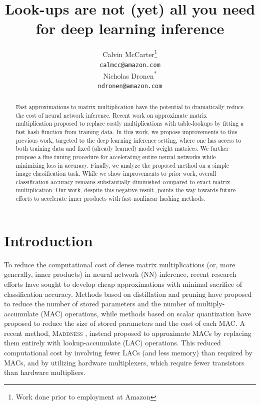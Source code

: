 \documentclass{article}
\title{Look-ups are not (yet) all you need \\ for deep learning inference}
\author{%

  Calvin McCarter\thanks{Work done prior to employment at Amazon} \\
  \texttt{calmcc@amazon.com} \\
  \And
  Nicholas Dronen\textsuperscript{*}\\
  \texttt{ndronen@amazon.com} \\  
}
\begin{document}
\maketitle

\begin{abstract}
  Fast approximations to matrix multiplication have the potential to dramatically reduce the cost of neural network inference. Recent work on approximate matrix multiplication proposed to replace costly multiplications with table-lookups by fitting a fast hash function from training data. In this work, we propose improvements to this previous work, targeted to the deep learning inference setting, where one has access to both training data and fixed (already learned) model weight matrices.
  We further propose a fine-tuning procedure for accelerating entire neural networks while minimizing loss in accuracy.
  Finally, we analyze the proposed method on a simple image classification task.
  While we show improvements to prior work, overall classification accuracy remains substantially diminished compared to exact matrix multiplication.
  Our work, despite this negative result, points the way towards future efforts to accelerate inner products with fast nonlinear hashing methods. 
\end{abstract}

\section{Introduction}
To reduce the computational cost of dense matrix multiplications (or, more generally, inner products) in neural network (NN) inference, recent research efforts have sought to develop cheap approximations with minimal sacrifice of classification accuracy.
Methods based on distillation \citep{bucilua2006model,hinton2015distilling} and pruning \citep{han2015deep,janowsky1989pruning} have proposed to reduce the number of stored parameters and the number of multiply-accumulate (MAC) operations, while methods based on scalar quantization \citep{wu2016quantized} have proposed to reduce the size of stored parameters and the cost of each MAC.  
A recent method, \textsc{Maddness} \citep{blalock2021a}, instead proposed to approximate MACs by replacing them entirely with lookup-accumulate (LAC) operations. 
This reduced computational cost by involving fewer LACs (and less memory) than required by MACs, and by utilizing hardware multiplexers, which require fewer transistors than hardware multipliers.
\end{document}
